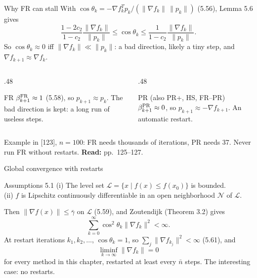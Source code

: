 \documentclass[12pt,aspectratio=169]{beamer}
\newcommand{\readpp}[1]{{\color{red!80!black}\textbf{Read:} #1}}
\begin{document}
\begin{frame}{Why FR can stall}
  With $\cos\theta_k = -\nabla f_k^Tp_k/(\|\nabla f_k\|\,\|p_k\|)$ (5.56), Lemma 5.6 gives
  \begin{equation}
    \frac{1-2c_2}{1-c_2}\frac{\|\nabla f_k\|}{\|p_k\|} \le \cos\theta_k \le \frac{1}{1-c_2}\frac{\|\nabla f_k\|}{\|p_k\|}. \tag{5.57}
  \end{equation}
  So $\cos\theta_k\approx0$ iff $\|\nabla f_k\|\ll\|p_k\|$: a bad direction, likely a tiny step, and $\nabla f_{k+1}\approx\nabla f_k$.
  \begin{columns}[T]
    \begin{column}{.48\textwidth}
      \begin{block}{FR}
        $\beta_{k+1}^{\rm FR}\approx1$ (5.58), so $p_{k+1}\approx p_k$.
        The bad direction is kept: a long run of useless steps.
      \end{block}
    \end{column}
    \begin{column}{.48\textwidth}
      \begin{block}{PR (also PR+, HS, FR--PR)}
        $\beta_{k+1}^{\rm PR}\approx0$, so $p_{k+1}\approx-\nabla f_{k+1}$.
        An automatic restart.
      \end{block}
    \end{column}
  \end{columns}
  \vspace{1ex}
  Example in [123], $n=100$: FR needs thousands of iterations, PR needs 37.
  \alert{Never run FR without restarts.}
  \readpp{pp.~125--127.}
\end{frame}

\begin{frame}{Global convergence with restarts}
  \begin{block}{Assumptions 5.1}
    (i) The level set $\mathcal L=\{x\mid f(x)\le f(x_0)\}$ is bounded.\\
    (ii) $f$ is Lipschitz continuously differentiable in an open neighborhood $\mathcal N$ of $\mathcal L$.
  \end{block}
  Then $\|\nabla f(x)\|\le\bar\gamma$ on $\mathcal L$ (5.59), and Zoutendijk (Theorem 3.2) gives
  \begin{equation}
    \sum_{k=0}^\infty\cos^2\theta_k\|\nabla f_k\|^2<\infty. \tag{5.60}
  \end{equation}
  At restart iterations $k_1,k_2,\dots$, $\cos\theta_k=1$, so $\sum_j\|\nabla f_{k_j}\|^2<\infty$ (5.61), and
  \begin{equation}
    \liminf_{k\to\infty}\|\nabla f_k\|=0 \tag{5.62}
  \end{equation}
  for every method in this chapter, restarted at least every $\bar n$ steps.
  The interesting case: \alert{no restarts}.
\end{frame}
\end{document}
